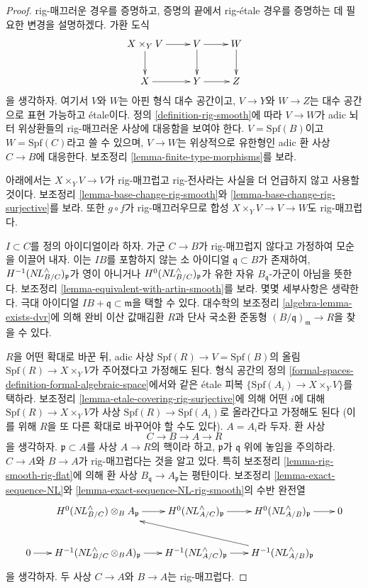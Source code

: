 \begin{proof}
rig-매끄러운 경우를 증명하고, 증명의 끝에서 rig-\'etale 경우를 증명하는 데
필요한 변경을 설명하겠다. 가환 도식
$$
\xymatrix{
X \times_Y V \ar[r] \ar[d] &
V \ar[d] \ar[r] &
W \ar[d] \\
X \ar[r] &
Y \ar[r] &
Z
}
$$
을 생각하자. 여기서 $V$와 $W$는 아핀 형식 대수 공간이고, $V \to Y$와
$W \to Z$는 대수 공간으로 표현 가능하고 \'etale이다. 정의
\ref{definition-rig-smooth}에 따라 $V \to W$가 adic 뇌터 위상환들의
rig-매끄러운 사상에 대응함을 보여야 한다.
$V = \text{Spf}(B)$이고 $W = \text{Spf}(C)$라고 쓸 수 있으며,
$V \to W$는 위상적으로 유한형인 adic 환 사상 $C \to B$에 대응한다.
보조정리 \ref{lemma-finite-type-morphisms}를 보라.

\medskip\noindent
아래에서는 $X \times_Y V \to V$가 rig-매끄럽고 rig-전사라는 사실을
더 언급하지 않고 사용할 것이다. 보조정리 \ref{lemma-base-change-rig-smooth}와
\ref{lemma-base-change-rig-surjective}를 보라. 또한 $g \circ f$가
rig-매끄러우므로 합성 $X \times_Y V \to V \to W$도 rig-매끄럽다.

\medskip\noindent
$I \subset C$를 정의 아이디얼이라 하자. 가군
$C \to B$가 rig-매끄럽지 않다고 가정하여 모순을 이끌어 내자. 이는
$IB$를 포함하지 않는 소 아이디얼 $\mathfrak q \subset B$가 존재하여,
$H^{-1}(\mathop{N\!L}\nolimits_{B/C}^\wedge)_\mathfrak p$가 영이 아니거나
$H^0(\mathop{N\!L}\nolimits_{B/C}^\wedge)_\mathfrak p$가 유한 자유
$B_\mathfrak q$-가군이 아님을 뜻한다. 보조정리
\ref{lemma-equivalent-with-artin-smooth}를 보라. 몇몇 세부사항은 생략한다.
극대 아이디얼 $IB + \mathfrak q \subset \mathfrak m$을 택할 수 있다.
대수학의 보조정리 \ref{algebra-lemma-exists-dvr}에 의해 완비 이산 값매김환
$R$과 단사 국소환 준동형 $(B/\mathfrak q)_\mathfrak m \to R$을 찾을 수 있다.

\medskip\noindent
$R$을 어떤 확대로 바꾼 뒤, adic 사상
$\text{Spf}(R) \to V = \text{Spf}(B)$의 올림
$\text{Spf}(R) \to X \times_Y V$가 주어졌다고 가정해도 된다.
형식 공간의 정의 \ref{formal-spaces-definition-formal-algebraic-space}에서와 같은
\'etale 피복 $\{\text{Spf}(A_i) \to X \times_Y V\}$를 택하라.
보조정리 \ref{lemma-etale-covering-rig-surjective}에 의해 어떤 $i$에 대해
$\text{Spf}(R) \to X \times_Y V$가 사상
$\text{Spf}(R) \to \text{Spf}(A_i)$로 올라간다고 가정해도 된다
(이를 위해 $R$을 또 다른 확대로 바꾸어야 할 수도 있다).
$A = A_i$라 두자. 환 사상
$$
C \to B \to A \to R
$$
을 생각하자. $\mathfrak p \subset A$를 사상 $A \to R$의 핵이라 하고,
$\mathfrak p$가 $\mathfrak q$ 위에 놓임을 주의하라.
$C \to A$와 $B \to A$가 rig-매끄럽다는 것을 알고 있다.
특히 보조정리 \ref{lemma-rig-smooth-rig-flat}에 의해 환 사상
$B_\mathfrak q \to A_\mathfrak p$는 평탄이다. 보조정리
\ref{lemma-exact-sequence-NL}와
\ref{lemma-exact-sequence-NL-rig-smooth}의 수반 완전열
$$
\xymatrix@C=1.8em{
&
H^0(\NL_{B/C}^\wedge) \otimes_B A_\mathfrak p \ar[r] &
H^0(\NL_{A/C}^\wedge)_\mathfrak p \ar[r] &
H^0(\NL_{A/B}^\wedge)_\mathfrak p \ar[r] & 0 \\
0 \ar[r] &
H^{-1}(\NL_{B/C}^\wedge \otimes_B A)_\mathfrak p \ar[r] &
H^{-1}(\NL_{A/C}^\wedge)_\mathfrak p \ar[r] &
H^{-1}(\NL_{A/B}^\wedge)_\mathfrak p \ar[llu]
}
$$
을 생각하자. 두 사상 $C \to A$와 $B \to A$는 rig-매끄럽다.


\end{proof}
